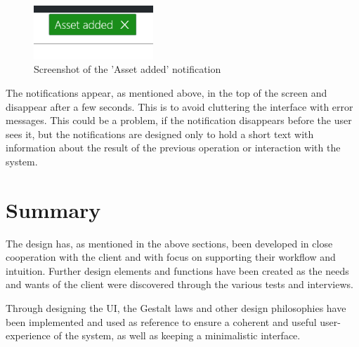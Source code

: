\begin{figure}[H]
    \centering
    \includegraphics[width=0.4\textwidth]{figures/UIDesignElements/GreenNotification.png}
    \caption{Screenshot of the 'Asset added' notification}
    \label{fig:AssetAddedNotification}
\end{figure}

The notifications appear, as mentioned above, in the top of the screen and disappear after a few seconds. This is to avoid cluttering the interface with error messages. This could be a problem, if the notification disappears before the user sees it, but the notifications are designed only to hold a short text with information about the result of the previous operation or interaction with the system.

\section{Summary}
The design has, as mentioned in the above sections, been developed in close cooperation with the client and with focus on supporting their workflow and intuition. Further design elements and functions have been created as the needs and wants of the client were discovered through the various tests and interviews.
\par
Through designing the UI, the Gestalt laws and other design philosophies have been implemented and used as reference to ensure a coherent and useful user-experience of the system, as well as keeping a minimalistic interface.
